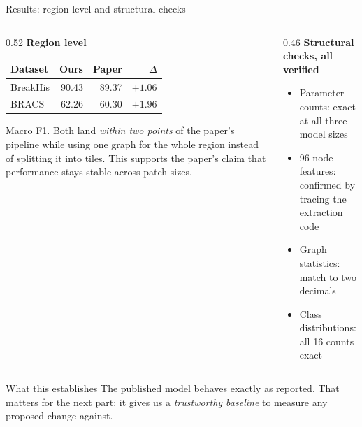 \documentclass[aspectratio=169,11pt]{beamer}
\begin{document}
\begin{frame}{Results: region level and structural checks}

  \begin{columns}[T]
    \begin{column}{0.52\textwidth}
      \textbf{Region level}
      \begin{center}\footnotesize
      \begin{tabular}{@{}lrrr@{}}
        \toprule
        \textbf{Dataset} & \textbf{Ours} & \textbf{Paper} & \textbf{$\Delta$} \\
        \midrule
        BreakHis & 90.43 & 89.37 & $+1.06$ \\
        BRACS    & 62.26 & 60.30 & $+1.96$ \\
        \bottomrule
      \end{tabular}
      \end{center}
      {\scriptsize Macro F1. Both land \emph{within two points} of the paper's
      pipeline while using one graph for the whole region instead of splitting it
      into tiles. This supports the paper's claim that performance stays stable
      across patch sizes.}
    \end{column}
    \begin{column}{0.46\textwidth}
      \textbf{Structural checks, all verified}
      \begin{itemize}\footnotesize
        \item Parameter counts: exact at all three model sizes
        \item 96 node features: confirmed by tracing the extraction code
        \item Graph statistics: match to two decimals
        \item Class distributions: all 16 counts exact
      \end{itemize}
    \end{column}
  \end{columns}

  \vspace{0.5em}
  \begin{block}{What this establishes}
    \small The published model behaves exactly as reported. That matters for the
    next part: it gives us a \emph{trustworthy baseline} to measure any proposed
    change against.
  \end{block}

\end{frame}
\end{document}
